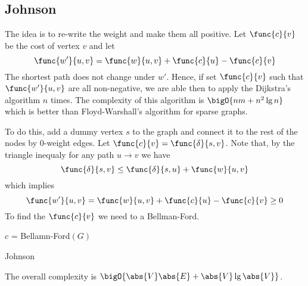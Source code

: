\subsection*{Johnson}
The idea is to re-write the weight and make them all positive. Let \(\func{c}{v}\) be the cost of vertex \(v\) and let
\begin{equation*}
    \func{w'}{u,v} = \func{w}{u,v} + \func{c}{u} - \func{c}{v}
\end{equation*}
The shortest path does not change under \(w'\). Hence, if set \(\func{c}{v}\) such that \(\func{w'}{u,v}\) are all non-negative, we are able then to apply the Dijkstra's algorithm \(n\) times. The complexity of this algorithm is \(\bigO{nm + n^2 \lg n}\) which is better than Floyd-Warshall's algorithm for sparse graphs. 

To do this, add a dummy vertex \(s\) to the graph and connect it to the rest of the nodes by \(0\)-weight edges. Let \(\func{c}{v} = \func{\delta}{s,v}\). Note that, by the triangle inequaly for any path \(u \to v\) we have 
\begin{equation*}
    \func{\delta}{s,v}\leq \func{\delta}{s,u} + \func{w}{u,v}
\end{equation*}
which implies 
\begin{equation*}
    \func{w'}{u,v} = \func{w}{u,v} + \func{c}{u} - \func{c}{v} \geq 0
\end{equation*}
To find the \(\func{c}{v}\) we need to a Bellman-Ford. 
\begin{algorithm}
    \DontPrintSemicolon
    \(c\) = Bellamn-Ford\((G)\)\;
    \caption{Johnson}
\end{algorithm}
The overall complexity is \(\bigO{\abs{V} \abs{E} + \abs{V} \lg \abs{V}}\).
